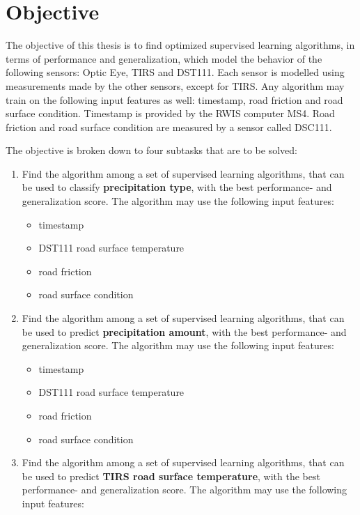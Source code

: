 \section{Objective} \label{sec:objective}
	The objective of this thesis is to find optimized supervised learning algorithms, in terms of performance and generalization, which model the behavior of the following sensors: Optic Eye, TIRS and DST111. Each sensor is modelled using measurements made by the other sensors, except for TIRS. Any algorithm may train on the following input features as well: timestamp, road friction and road surface condition. Timestamp is provided by the RWIS computer MS4. Road friction and road surface condition are measured by a sensor called DSC111.
	
	The objective is broken down to four subtasks that are to be solved:
	\begin{enumerate}
		\item Find the algorithm among a set of supervised learning algorithms, that can be used to classify \textbf{precipitation type}, with the best performance- and generalization score. The algorithm may use the following input features: 
			\begin{itemize}
				\item timestamp
				\item DST111 road surface temperature
				\item road friction
				\item road surface condition
			\end{itemize}
		\item Find the algorithm among a set of supervised learning algorithms, that can be used to predict \textbf{precipitation amount}, with the best performance- and generalization score. The algorithm may use the following input features: 
			\begin{itemize}
				\item timestamp
				\item DST111 road surface temperature
				\item road friction
				\item road surface condition
			\end{itemize}
		\item Find the algorithm among a set of supervised learning algorithms, that can be used to predict \textbf{TIRS road surface temperature}, with the best performance- and generalization score. The algorithm may use the following input features: 
			\begin{itemize}

\end{itemize}
\end{enumerate}
